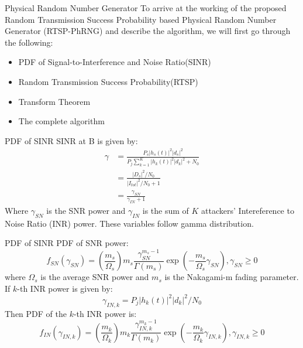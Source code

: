 \documentclass{beamer}
\providecommand{\brak}[1]{\ensuremath{\left(#1\right)}}
\providecommand{\Mod}[1]{\ensuremath{\left\lvert#1\right\rvert}}
\begin{document}
\begin{frame}{Physical Random Number Generator}
To arrive at the working of the proposed Random Transmission Success Probability based Physical Random Number Generator (RTSP-PhRNG) and describe the algorithm, we will first go through the following:\\
\begin{itemize}
    \item PDF of Signal-to-Interference and Noise Ratio(SINR)
    \item Random Transmission Success Probability(RTSP)
    \item Transform Theorem
    \item The complete algorithm
\end{itemize}
\end{frame}
\begin{frame}{PDF of SINR}
    SINR at B is given by:
    \begin{align}
        \nonumber\gamma &= \frac{P_{s}\Mod{h_{s}\brak{t}}^2\Mod{d_{s}}^2}{P_{j}\sum_{k=1}^{K}\Mod{h_{k}\brak{t}}^2\Mod{d_{k}}^2+N_{0}}\\
        \nonumber&= \frac{\Mod{D_{s}}^2/N_{0}}{\Mod{I_{tot}}^2/N_{0}+1}\\
        &= \frac{\gamma_{SN}}{\gamma_{IN}+1}\label{eq:2}
    \end{align}
    Where $\gamma_{SN}$ is the SNR power and $\gamma_{IN}$ is the sum of $K$ attackers' Intereference to Noise Ratio (INR) power. These variables follow gamma distribution.
\end{frame}
\begin{frame}{PDF of SINR}
    PDF of SNR power:
    \begin{equation}
        f_{SN}\brak{\gamma_{SN}} = \brak{\frac{m_{s}}{\Omega_{s}}}m_{s}\frac{\gamma_{SN}^{m_{s}-1}}{\Gamma\brak{m_{s}}}\exp\brak{-\frac{m_{s}}{\Omega_{s}}\gamma_{SN}}, \gamma_{SN}\geq{0}\label{eq:3}
    \end{equation}
    where $\Omega_{s}$ is the average SNR power and $m_{s}$ is the Nakagami-m fading parameter.\\
    If $k$-th INR power is given by: 
    \begin{equation}
        \nonumber\gamma_{IN,k} = P_{j}\Mod{h_{k}\brak{t}}^2\Mod{d_{k}}^2/N_{0}
    \end{equation}
    Then PDF of the $k$-th INR power is:
    \begin{equation}
         f_{IN}\brak{\gamma_{IN,k}} = \brak{\frac{m_{k}}{\Omega_{k}}}m_{k}\frac{\gamma_{IN,k}^{m_{k}-1}}{\Gamma\brak{m_{k}}}\exp\brak{-\frac{m_{k}}{\Omega_{k}}\gamma_{IN,k}}, \gamma_{IN,k}\geq{0}
    \end{equation}
\end{frame}
\end{document}
